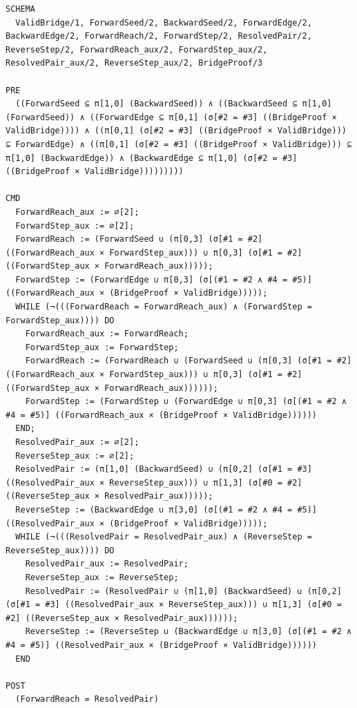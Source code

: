 \documentclass[10pt]{article}
\begin{document}
\begin{Verbatim}[fontsize=\scriptsize,breaklines=true,breakanywhere=true,frame=single,framesep=1.5mm]
SCHEMA
  ValidBridge/1, ForwardSeed/2, BackwardSeed/2, ForwardEdge/2, BackwardEdge/2, ForwardReach/2, ForwardStep/2, ResolvedPair/2, ReverseStep/2, ForwardReach_aux/2, ForwardStep_aux/2, ResolvedPair_aux/2, ReverseStep_aux/2, BridgeProof/3

PRE
  ((ForwardSeed ⊆ π[1,0] (BackwardSeed)) ∧ ((BackwardSeed ⊆ π[1,0] (ForwardSeed)) ∧ ((ForwardEdge ⊆ π[0,1] (σ[#2 = #3] ((BridgeProof × ValidBridge)))) ∧ ((π[0,1] (σ[#2 = #3] ((BridgeProof × ValidBridge))) ⊆ ForwardEdge) ∧ ((π[0,1] (σ[#2 = #3] ((BridgeProof × ValidBridge))) ⊆ π[1,0] (BackwardEdge)) ∧ (BackwardEdge ⊆ π[1,0] (σ[#2 = #3] ((BridgeProof × ValidBridge)))))))))

CMD
  ForwardReach_aux := ∅[2];
  ForwardStep_aux := ∅[2];
  ForwardReach := (ForwardSeed ∪ (π[0,3] (σ[#1 = #2] ((ForwardReach_aux × ForwardStep_aux))) ∪ π[0,3] (σ[#1 = #2] ((ForwardStep_aux × ForwardReach_aux)))));
  ForwardStep := (ForwardEdge ∪ π[0,3] (σ[(#1 = #2 ∧ #4 = #5)] ((ForwardReach_aux × (BridgeProof × ValidBridge)))));
  WHILE (¬(((ForwardReach = ForwardReach_aux) ∧ (ForwardStep = ForwardStep_aux)))) DO
    ForwardReach_aux := ForwardReach;
    ForwardStep_aux := ForwardStep;
    ForwardReach := (ForwardReach ∪ (ForwardSeed ∪ (π[0,3] (σ[#1 = #2] ((ForwardReach_aux × ForwardStep_aux))) ∪ π[0,3] (σ[#1 = #2] ((ForwardStep_aux × ForwardReach_aux))))));
    ForwardStep := (ForwardStep ∪ (ForwardEdge ∪ π[0,3] (σ[(#1 = #2 ∧ #4 = #5)] ((ForwardReach_aux × (BridgeProof × ValidBridge))))))
  END;
  ResolvedPair_aux := ∅[2];
  ReverseStep_aux := ∅[2];
  ResolvedPair := (π[1,0] (BackwardSeed) ∪ (π[0,2] (σ[#1 = #3] ((ResolvedPair_aux × ReverseStep_aux))) ∪ π[1,3] (σ[#0 = #2] ((ReverseStep_aux × ResolvedPair_aux)))));
  ReverseStep := (BackwardEdge ∪ π[3,0] (σ[(#1 = #2 ∧ #4 = #5)] ((ResolvedPair_aux × (BridgeProof × ValidBridge)))));
  WHILE (¬(((ResolvedPair = ResolvedPair_aux) ∧ (ReverseStep = ReverseStep_aux)))) DO
    ResolvedPair_aux := ResolvedPair;
    ReverseStep_aux := ReverseStep;
    ResolvedPair := (ResolvedPair ∪ (π[1,0] (BackwardSeed) ∪ (π[0,2] (σ[#1 = #3] ((ResolvedPair_aux × ReverseStep_aux))) ∪ π[1,3] (σ[#0 = #2] ((ReverseStep_aux × ResolvedPair_aux))))));
    ReverseStep := (ReverseStep ∪ (BackwardEdge ∪ π[3,0] (σ[(#1 = #2 ∧ #4 = #5)] ((ResolvedPair_aux × (BridgeProof × ValidBridge))))))
  END

POST
  (ForwardReach = ResolvedPair)
\end{Verbatim}
\end{document}
